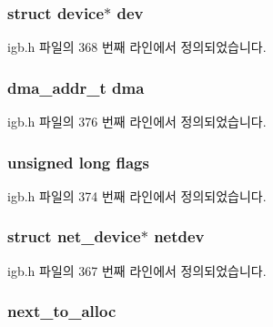 \subsubsection[{\texorpdfstring{dev}{dev}}]{\setlength{\rightskip}{0pt plus 5cm}struct device$\ast$ dev}\hypertarget{structigb__ring_acf6a82c73e7a9d99293d9ce0b8837faf}{}\label{structigb__ring_acf6a82c73e7a9d99293d9ce0b8837faf}


igb.\+h 파일의 368 번째 라인에서 정의되었습니다.

\subsubsection[{\texorpdfstring{dma}{dma}}]{\setlength{\rightskip}{0pt plus 5cm}dma\+\_\+addr\+\_\+t dma}\hypertarget{structigb__ring_a5624e64f422a13783a01fb56a8e67747}{}\label{structigb__ring_a5624e64f422a13783a01fb56a8e67747}


igb.\+h 파일의 376 번째 라인에서 정의되었습니다.

\subsubsection[{\texorpdfstring{flags}{flags}}]{\setlength{\rightskip}{0pt plus 5cm}unsigned long flags}\hypertarget{structigb__ring_a9e339c2784bd040b26a5112866700bff}{}\label{structigb__ring_a9e339c2784bd040b26a5112866700bff}


igb.\+h 파일의 374 번째 라인에서 정의되었습니다.

\subsubsection[{\texorpdfstring{netdev}{netdev}}]{\setlength{\rightskip}{0pt plus 5cm}struct net\+\_\+device$\ast$ netdev}\hypertarget{structigb__ring_a5b3eca5b24cb88421c27369d02ebe884}{}\label{structigb__ring_a5b3eca5b24cb88421c27369d02ebe884}


igb.\+h 파일의 367 번째 라인에서 정의되었습니다.

\subsubsection[{\texorpdfstring{next\+\_\+to\+\_\+alloc}{next_to_alloc}}]{ next\+\_\+to\+\_\+alloc}\hypertarget{structigb__ring_a0ed19f611cda670eaf9cd246fb6d6c07}{}\label{structigb__ring_a0ed19f611cda670eaf9cd246fb6d6c07}


